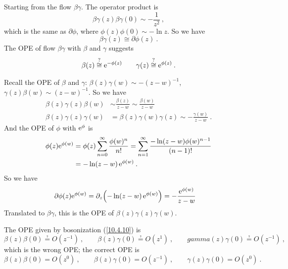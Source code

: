 	Starting from the flow $\beta\gamma$. The operator product is
	\begin{equation}
		\beta\gamma(z)\beta\gamma(0) \sim -\frac{1}{z^{2}} \:, \label{10.4.8}
	\end{equation}
	which is the same as $\partial\phi$, where $\phi(z)\phi(0)\sim -\ln z$. So we have
	\begin{equation}
		\beta\gamma(z)\cong \partial\phi(z)\:. \label{10.4.9}
	\end{equation}
	The OPE of flow $\beta\gamma$ with $\beta$ and $\gamma$ suggests
	\begin{equation}
		\beta(z)\overset{?}{\cong} \mathrm{e}^{-\phi(z)} \qquad
		\gamma(z)\overset{?}{\cong} \mathrm{e}^{\phi(z)} \:. \label{10.4.10}
	\end{equation}
	\begin{tcolorbox}[breakable]
		Recall the OPE of $\beta$ and $\gamma$: $\beta(z)\gamma(w)\sim -(z-w)^{-1}$, $\gamma(z)\beta(w)\sim(z-w)^{-1}$. So we have
		\begin{align*}
			\beta(z)\gamma(z)\beta(w)&\sim \frac{\beta(z)}{z-w} \sim \frac{\beta(w)}{z-w} \\
			\beta(z)\gamma(z)\gamma(w)&= \beta(z)\gamma(w)\gamma(z) \sim -\frac{\gamma(w)}{z-w} \:.
		\end{align*}
		And the OPE of $\phi$ with $\mathrm{e}^{\phi}$ is
		\begin{align*}
			\phi(z)\mathrm{e}^{\phi(w)} &=\phi(z) \sum_{n=0}^{\infty}\frac{\phi(w)^{n}}{n!}=
			\sum_{n=1}^{\infty}\frac{-\ln(z-w)\phi(w)^{n-1}}{(n-1)!}\\
			&=-\ln(z-w)\,\mathrm{e}^{\phi(w)} \:.
		\end{align*}
		So we have
		\begin{align*}
			\partial\phi(z)\mathrm{e}^{\phi(w)}& =\partial_{z} \Bigl(-\ln(z-w)\,\mathrm{e}^{\phi(w)}\Bigr) = -\frac{\mathrm{e}^{\phi(w)}}{z-w}
		\end{align*}
		Translated to $\beta\gamma$, this is the OPE of $\beta(z)\gamma(z)\gamma(w)$.
	\end{tcolorbox}
	\noindent The OPE given by bosonization (\ref{10.4.10}) is
	\begin{equation}
		\beta(z)\beta(0) \questeq O(z^{-1}) \:,\qquad 
		\beta(z)\gamma(0)\questeq O(z^{1}) \:, \qquad
		gamma(z)\gamma(0) \questeq O(z^{-1}) \:, \label{10.4.11}
	\end{equation}
	which is the wrong OPE; the correct OPE is
	\begin{equation}
		\beta(z)\beta(0) = O(z^{0}) \:,\qquad 
		\beta(z)\gamma(0)= O(z^{-1}) \:, \qquad
		\gamma(z)\gamma(0) = O(z^{0}) \:. \label{10.4.12}
	\end{equation}
